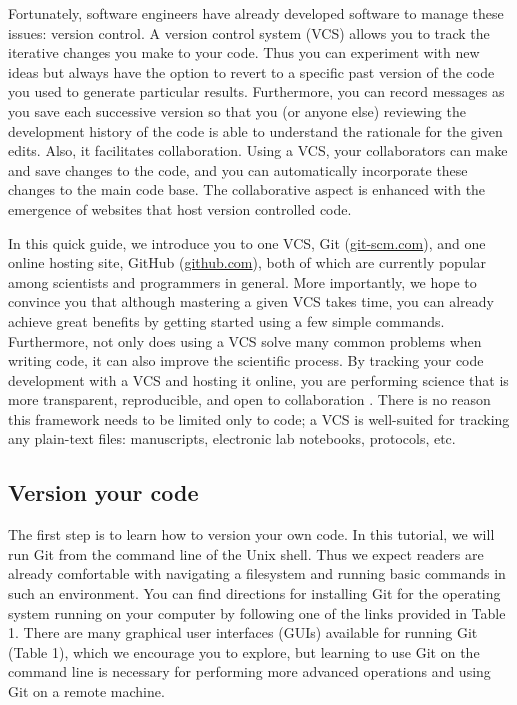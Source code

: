\documentclass[10pt]{article}
\begin{document}
Fortunately, software engineers have already developed software to manage these issues: version control. 
A version control system (VCS) allows you to track the iterative changes you make to your code.
Thus you can experiment with new ideas but always have the option to revert to a specific past version of the code you used to generate particular results.
Furthermore, you can record messages as you save each successive version so that you (or anyone else) reviewing the development history of the code is able to understand the rationale for the given edits.
Also, it facilitates collaboration.
Using a VCS, your collaborators can make and save changes to the code, and you can automatically incorporate these changes to the main code base.
The collaborative aspect is enhanced with the emergence of websites that host version controlled code.

In this quick guide, we introduce you to one VCS, Git (\href{http://git-scm.com/}{git-scm.com}), and one online hosting site, GitHub (\href{https://github.com}{github.com}), both of which are currently popular among scientists and programmers in general.
More importantly, we hope to convince you that although mastering a given VCS takes time, you can already achieve great benefits by getting started using a few simple commands.
Furthermore, not only does using a VCS solve many common problems when writing code, it can also improve the scientific process.
By tracking your code development with a VCS and hosting it online, you are performing science that is more transparent, reproducible, and open to collaboration \cite{23448176, 24415924}.
There is no reason this framework needs to be limited only to code; a VCS is well-suited for tracking any plain-text files: manuscripts, electronic lab notebooks, protocols, etc.
  

\subsection{Version your code}

The first step is to learn how to version your own code.
In this tutorial, we will run Git from the command line of the Unix shell.
Thus we expect readers are already comfortable with navigating a filesystem and running basic commands in such an environment.
You can find directions for installing Git for the operating system running on your computer by following one of the links provided in Table 1.
There are many graphical user interfaces (GUIs) available for running Git (Table 1), which we encourage you to explore, but learning to use Git on the command line is necessary for performing more advanced operations and using Git on a remote machine.
\end{document}
